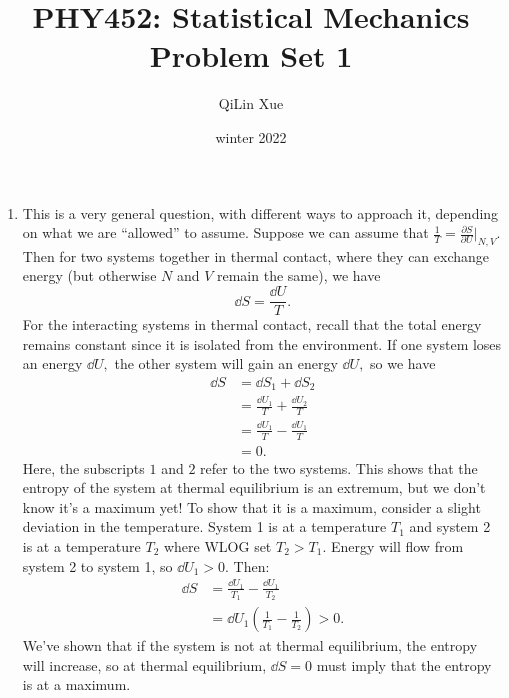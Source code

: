\documentclass{article}
\title{PHY452: Statistical Mechanics \\ Problem Set 1}
\author{QiLin Xue}
\date{winter 2022}
\numberwithin{equation}{section}
\begin{document}
\maketitle
\begin{enumerate}
    \item This is a very general question, with different ways to approach it, depending on what we are ``allowed'' to assume. Suppose we can assume that $\frac{1}{T} = \frac{\partial S}{\partial U}\bigg|_{N,V}.$ Then for two systems together in thermal contact, where they can exchange energy (but otherwise $N$ and $V$ remain the same), we have
    \begin{equation}
        \dd{S} = \frac{\dd{U}}{T}.
    \end{equation}
    For the interacting systems in thermal contact, recall that the total energy remains constant since it is isolated from the environment. If one system loses an energy $\dd{U},$ the other system will gain an energy $\dd{U},$ so we have 
    \begin{align}
        \dd{S} &= \dd{S}_1 + \dd{S}_2 \\ 
        &= \frac{\dd{U}_1}{T} + \frac{\dd{U}_2}{T} \\ 
        &= \frac{\dd{U}_1}{T} - \frac{\dd{U}_1}{T} \\ 
        &= 0.
    \end{align}
    Here, the subscripts $1$ and $2$ refer to the two systems. This shows that the entropy of the system at thermal equilibrium is an extremum, but we don't know it's a maximum yet! To show that it is a maximum, consider a slight deviation in the temperature. System 1 is at a temperature $T_1$ and system 2 is at a temperature $T_2$ where WLOG set $T_2>T_1.$ Energy will flow from system 2 to system 1, so $\dd{U}_1>0.$ Then:
    \begin{align}
        \dd{S} &= \frac{\dd{U}_1}{T_1} - \frac{\dd{U}_1}{T_2} \\ 
                &= \dd{U}_1\left(\frac{1}{T_1}-\frac{1}{T_2}\right) >0.
    \end{align}
    We've shown that if the system is not at thermal equilibrium, the entropy will increase, so at thermal equilibrium, $\dd{S}=0$ must imply that the entropy is at a maximum.


\end{enumerate}
\end{document}
